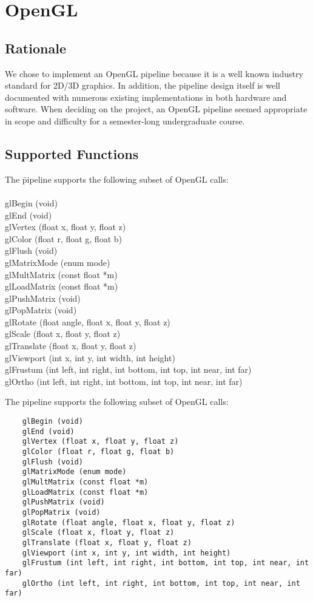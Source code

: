 \documentclass[letterpaper,10pt]{article}
\begin{document}
\section{OpenGL}
\subsection{Rationale}
We chose to implement an OpenGL pipeline because it is a well known industry standard for 2D/3D graphics. In addition, the pipeline design itself is well documented with numerous existing implementations in both hardware and software. When deciding on the project, an OpenGL pipeline seemed appropriate in scope and difficulty for a semester-long undergraduate course.

\subsection{Supported Functions}

\begin{tabbing}
The \= pipeline supports the following subset of OpenGL calls:\\
\\
\> glBegin (void)\\
\> glEnd (void)\\
\> glVertex (float x, float y, float z)\\
\> glColor (float r, float g, float b)\\
\> glFlush (void)\\
\> glMatrixMode (enum mode)\\
\> glMultMatrix (const float *m)\\
\> glLoadMatrix (const float *m)\\
\> glPushMatrix (void)\\
\> glPopMatrix (void)\\
\> glRotate (float angle, float x, float y, float z)\\
\> glScale (float x, float y, float z)\\
\> glTranslate (float x, float y, float z)\\
\> glViewport (int x, int y, int width, int height)\\
\> glFrustum (int left, int right, int bottom, int top, int near, int far)\\
\> glOrtho (int left, int right, int bottom, int top, int near, int far)\\
\end{tabbing}

The pipeline supports the following subset of OpenGL calls:
\begin{verbatim}
	glBegin (void)
	glEnd (void)
	glVertex (float x, float y, float z)
	glColor (float r, float g, float b)
	glFlush (void)
	glMatrixMode (enum mode)
	glMultMatrix (const float *m)
	glLoadMatrix (const float *m)
	glPushMatrix (void)
	glPopMatrix (void)
	glRotate (float angle, float x, float y, float z)
	glScale (float x, float y, float z)
	glTranslate (float x, float y, float z)
	glViewport (int x, int y, int width, int height)
	glFrustum (int left, int right, int bottom, int top, int near, int far)
	glOrtho (int left, int right, int bottom, int top, int near, int far)
\end{verbatim}
\end{document}
